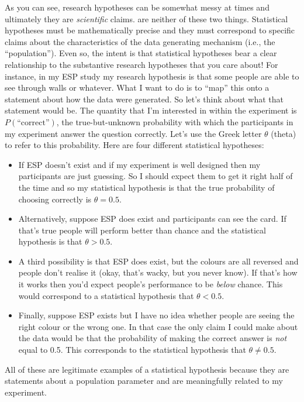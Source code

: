 As you can see, research hypotheses can be somewhat messy at times and ultimately they are {\it scientific} claims.  are neither of these two things. Statistical hypotheses must be mathematically precise and they must correspond to specific claims about the characteristics of the data generating mechanism (i.e., the ``population''). Even so, the intent is that statistical hypotheses bear a clear relationship to the substantive research hypotheses that you care about! For instance, in my ESP study my research hypothesis is that some people are able to see through walls or whatever. What I want to do is to ``map'' this onto a statement about how the data were generated. So let's think about what that statement would be. The quantity that I'm interested in within the experiment is $P(\mbox{``correct''})$, the true-but-unknown probability with which the participants in my experiment answer the question correctly. Let's use the Greek letter $\theta$ (theta) to refer to this probability. Here are four different statistical hypotheses:
\begin{itemize}
\item If ESP doesn't exist and if my experiment is well designed then my participants are just guessing. So I should expect them to get it right half of the time and so my statistical hypothesis is that the true probability of choosing correctly is $\theta = 0.5$. 
\item Alternatively, suppose ESP does exist and participants can see the card. If that's true people will perform better than chance and the statistical hypothesis is that $\theta > 0.5$. 
\item A third possibility is that ESP does exist, but the colours are all reversed and people don't realise it (okay, that's wacky, but you never know). If that's how it works then you'd expect people's performance to be {\it below} chance. This would correspond to a statistical hypothesis that $\theta < 0.5$. 
\item Finally, suppose ESP exists but I have no idea whether people are seeing the right colour or the wrong one. In that case the only claim I could make about the data would be that the probability of making the correct answer is {\it not} equal to 0.5. This corresponds to the statistical hypothesis that $\theta \neq 0.5$. 
\end{itemize}
All of these are legitimate examples of a statistical hypothesis because they are statements about a population parameter and are meaningfully related to my experiment.

